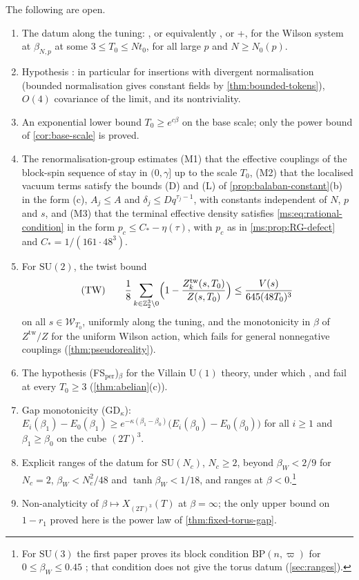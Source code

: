 \documentclass[11pt,a4paper]{amsart}
\theoremstyle{definition}
\theoremstyle{remark}
\numberwithin{equation}{section}
\newcommand{\Z}{\mathbb{Z}}          %
\newcommand{\Wwin}{\mathcal{W}}      %
\newcommand{\SU}{\mathrm{SU}}              %
\newcommand{\U}{\mathrm{U}}                %
\newcommand{\TT}{\mathbb{T}}               %
\newcommand{\Zc}{\mathcal{Z}}              %
\newcommand{\XT}[2]{X_{#1}(#2)}            %
\newcommand{\Vol}[1]{V(#1)}                %
\newcommand{\cube}[1]{(2#1)^3}             %
\newcommand{\Mcirc}{\text{\upshape(M$^{\circ}$)}}   %
\newcommand{\Bcirc}{\text{\upshape(B$^{\circ}$)}}   %
\newcommand{\Hcirc}{\text{\upshape(H$^{\circ}$)}}   %
\newcommand{\Bstar}{\text{\upshape(B$^{*}$)}}       %
\newcommand{\hypW}{\text{\upshape(W)}}              %
\newcommand{\UVB}{\text{\upshape(UVB)}}             %
\newcommand{\Kone}{\text{\upshape(K1)}}             %
\newcommand{\Ktwo}{\text{\upshape(K2)}}             %
\newcommand{\tzero}{t_0}                   %
\newcommand{\betaNp}{\beta_{N,p}}          %
\newcommand{\betaW}{\beta_{W}}             %
\begin{document}
The following are open.
\begin{enumerate}[label=\textup{(\arabic*)},leftmargin=*]
\item The datum along the tuning: \Mcirc, or equivalently \Bcirc, \Hcirc{} or \Kone+\Ktwo, for the Wilson system at $\betaNp$ at some $3\le T_0\le N\tzero$, for all large $p$ and $N\ge N_0(p)$.
\item Hypothesis \hypW: in particular \UVB{} for insertions with divergent normalisation (bounded normalisation gives constant fields by \cref{thm:bounded-tokens}), $O(4)$ covariance of the limit, and its nontriviality.
\item An exponential lower bound $T_0\ge e^{c\beta}$ on the base scale; only the power bound of \cref{cor:base-scale} is proved.
\item The renormalisation-group estimates (M1) that the effective couplings of the block-spin sequence of \cite{balaban1989b} stay in $(0,\gamma]$ up to the scale $T_0$, (M2) that the localised vacuum terms satisfy the bounds (D) and (L) of \cref{prop:balaban-constant}(b) in the form (c), $A_j\le A$ and $\delta_j\le Dq^{\tau_j-1}$, with constants independent of $N$, $p$ and $s$, and (M3) that the terminal effective density satisfies \eqref{ms:eq:rational-condition} in the form $p_c\le C_*-\eta(\tau)$, with $p_c$ as in \cref{ms:prop:RG-defect} and $C_*=1/(161\cdot48^3)$.
\item For $\SU(2)$, the twist bound
\[
\textup{(TW)}\qquad\frac18\sum_{k\in\Z_2^3\setminus0}\Bigl(1-\frac{Z^{\mathrm{tw}}_k(s,T_0)}{Z(s,T_0)}\Bigr)\le\frac{\Vol{s}}{645(48T_0)^3}
\]
on all $s\in\Wwin_{T_0}$, uniformly along the tuning, and the monotonicity in $\beta$ of $Z^{\mathrm{tw}}/Z$ for the uniform Wilson action, which fails for general nonnegative couplings (\cref{thm:pseudoreality}).
\item The hypothesis \textup{(FS$_{\mathrm{per}}$)}$_\beta$ for the Villain $\U(1)$ theory, under which \Bcirc, \Mcirc{} and \Bstar{} fail at every $T_0\ge3$ (\cref{thm:abelian}(c)).
\item Gap monotonicity (GD$_\kappa$): $E_i(\beta_1)-E_0(\beta_1)\ge e^{-\kappa(\beta_1-\beta_0)}\bigl(E_i(\beta_0)-E_0(\beta_0)\bigr)$ for all $i\ge1$ and $\beta_1\ge\beta_0$ on the cube $\cube{T}$.
\item Explicit ranges of the datum for $\SU(N_c)$, $N_c\ge2$, beyond $\betaW<2/9$ for $N_c=2$, $\betaW<N_c^2/48$ and $\tanh\betaW<1/18$, and ranges at $\beta<0$.\footnote{For $\SU(3)$ the first paper proves its block condition $\mathrm{BP}(n,\varpi)$ for $0\le\betaW\le0.45$ \cite[Theorem~C(i)]{bhattacharjee2026first}; that condition does not give the torus datum (\cref{sec:ranges}).}
\item Non-analyticity of $\beta\mapsto\XT{\cube{T}}{T}$ at $\beta=\infty$; the only upper bound on $1-r_1$ proved here is the power law of \cref{thm:fixed-torus-gap}.
\end{enumerate}
\end{document}
